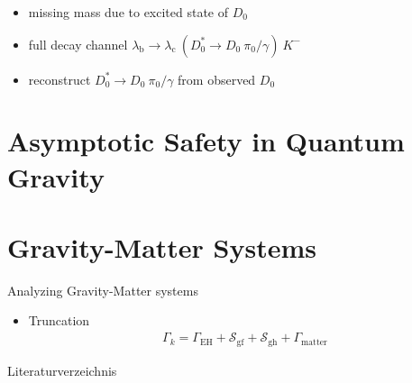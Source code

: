 \documentclass{beamer}
\begin{document}
\begin{frame}
\begin{itemize}
	\item missing mass due to excited state of $D_{\textrm{0}}$
	\item full decay channel $\lambda_{\textrm{b}} \rightarrow \lambda_{\textrm{c}} \ ({D_{\textrm{0}}^{\textrm{*}} \rightarrow D_{\textrm{0}} \ \pi_{\textrm{0}}/\gamma}) \ K^{-} $
	\item reconstruct ${D_{\textrm{0}}^{\textrm{*}} \rightarrow D_{\textrm{0}} \ \pi_{\textrm{0}}/\gamma}$ from observed $D_{\textrm{0}}$
\end{itemize}
\end{frame}

\section{Asymptotic Safety in Quantum Gravity}

\section{Gravity-Matter Systems}
\begin{frame}{Analyzing Gravity-Matter systems}
\begin{itemize}
	\item Truncation \cite{DonaEichhornPercacci2013}
	\begin{align}
		\Gamma_k = \Gamma_{\text{EH}} + \mathcal{S}_{\text{gf}} + \mathcal{S}_{\text{gh}} + \Gamma_{\text{matter}}
	\end{align}
\end{itemize}
\end{frame}
\begin{frame}[shrink=20]{Literaturverzeichnis}

\printbibliography
\cite{*} %
\end{frame}
\end{document}
